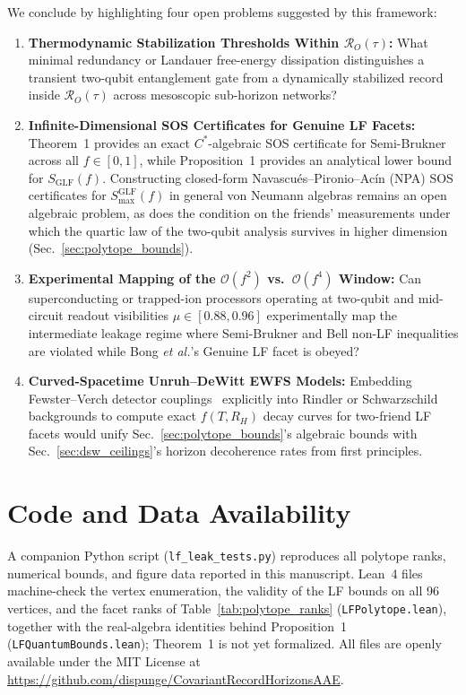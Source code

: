 We conclude by highlighting four open problems suggested by this framework:
\begin{enumerate}
    \item \textbf{Thermodynamic Stabilization Thresholds Within $\mathcal{R}_O(\tau)$:} What minimal redundancy or Landauer free-energy dissipation distinguishes a transient two-qubit entanglement gate from a dynamically stabilized record inside $\mathcal{R}_O(\tau)$ across mesoscopic sub-horizon networks?
    \item \textbf{Infinite-Dimensional SOS Certificates for Genuine LF Facets:} Theorem~1 provides an exact $C^*$-algebraic SOS certificate for Semi-Brukner across all $f \in [0, 1]$, while Proposition~1 provides an analytical lower bound for $S_{\mathrm{GLF}}(f)$. Constructing closed-form Navascu\'{e}s--Pironio--Ac\'{i}n (NPA) SOS certificates for $S_{\max}^{\mathrm{GLF}}(f)$ in general von Neumann algebras remains an open algebraic problem, as does the condition on the friends' measurements under which the quartic law of the two-qubit analysis survives in higher dimension (Sec.~\ref{sec:polytope_bounds}).
    \item \textbf{Experimental Mapping of the $\mathcal{O}(f^2)$ vs.\ $\mathcal{O}(f^4)$ Window:} Can superconducting or trapped-ion processors operating at two-qubit and mid-circuit readout visibilities $\mu \in [0.88, 0.96]$ experimentally map the intermediate leakage regime where Semi-Brukner and Bell non-LF inequalities are violated while Bong \emph{et al.}'s Genuine LF facet is obeyed?
    \item \textbf{Curved-Spacetime Unruh--DeWitt EWFS Models:} Embedding Fewster--Verch detector couplings~\cite{fewster2020} explicitly into Rindler or Schwarzschild backgrounds to compute exact $f(T, R_H)$ decay curves for two-friend LF facets would unify Sec.~\ref{sec:polytope_bounds}'s algebraic bounds with Sec.~\ref{sec:dsw_ceilings}'s horizon decoherence rates from first principles.
\end{enumerate}

\section*{Code and Data Availability}
A companion Python script (\texttt{lf\_leak\_tests.py}) reproduces all polytope ranks, numerical bounds, and figure data reported in this manuscript. Lean~4 files machine-check the vertex enumeration, the validity of the LF bounds on all 96 vertices, and the facet ranks of Table~\ref{tab:polytope_ranks} (\texttt{LFPolytope.lean}), together with the real-algebra identities behind Proposition~1 (\texttt{LFQuantumBounds.lean}); Theorem~1 is not yet formalized. All files are openly available under the MIT License at \url{https://github.com/dispunge/CovariantRecordHorizonsAAE}.
